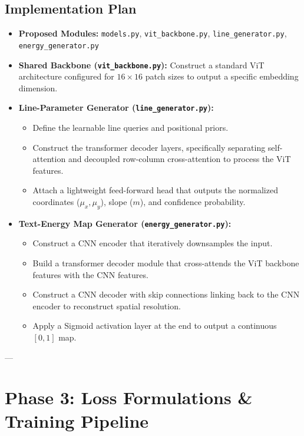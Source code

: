 \documentclass[12pt,a4paper]{article}
\begin{document}
\subsection{Implementation Plan}
\begin{itemize}
    \item \textbf{Proposed Modules:} \texttt{models.py}, \texttt{vit\_backbone.py}, \texttt{line\_generator.py}, \texttt{energy\_generator.py}
    \item \textbf{Shared Backbone (\texttt{vit\_backbone.py}):} Construct a standard ViT architecture configured for $16 \times 16$ patch sizes to output a specific embedding dimension.
    \item \textbf{Line-Parameter Generator (\texttt{line\_generator.py}):} 
    \begin{itemize}
        \item Define the learnable line queries and positional priors.
        \item Construct the transformer decoder layers, specifically separating self-attention and decoupled row-column cross-attention to process the ViT features.
        \item Attach a lightweight feed-forward head that outputs the normalized coordinates ($\mu_x, \mu_y$), slope ($m$), and confidence probability.
    \end{itemize}
    \item \textbf{Text-Energy Map Generator (\texttt{energy\_generator.py}):}
    \begin{itemize}
        \item Construct a CNN encoder that iteratively downsamples the input.
        \item Build a transformer decoder module that cross-attends the ViT backbone features with the CNN features.
        \item Construct a CNN decoder with skip connections linking back to the CNN encoder to reconstruct spatial resolution.
        \item Apply a Sigmoid activation layer at the end to output a continuous $[0, 1]$ map.
    \end{itemize}
\end{itemize}

---

\section{Phase 3: Loss Formulations \& Training Pipeline}
\end{document}

